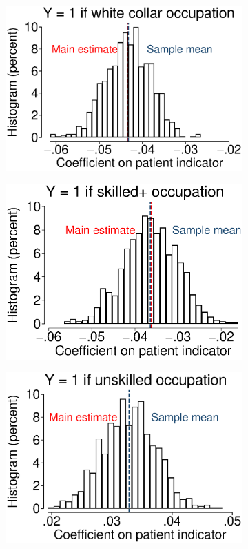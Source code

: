 \documentclass[12pt,english]{article}
\begin{document}
\begin{figure}[!ht]
\begin{subfigure}{0.49\textwidth}
	\centering
	\includegraphics[width=1.00\linewidth]{../output/02_appendix/figure_a08_panel_03.eps}
\end{subfigure}
\begin{subfigure}{0.49\textwidth}
	\centering
	\includegraphics[width=1.00\linewidth]{../output/02_appendix/figure_a08_panel_04.eps}
\end{subfigure}
\begin{subfigure}{0.49\textwidth}
	\centering
	\includegraphics[width=1.00\linewidth]{../output/02_appendix/figure_a08_panel_05.eps}

\end{subfigure}
\end{figure}
\end{document}

